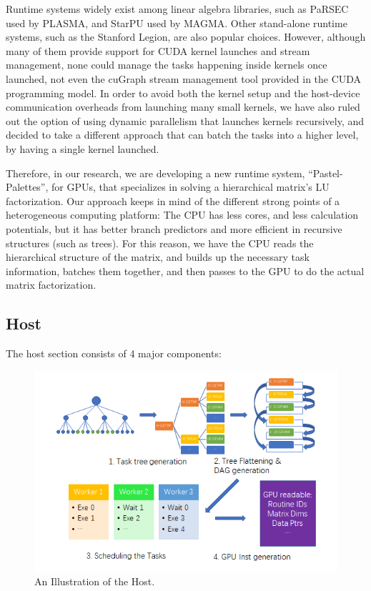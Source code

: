 \documentclass[sigconf]{acmart}
\begin{document}
Runtime systems widely exist among linear algebra libraries, such as PaRSEC\cite{Hoque:2017:DTD:3148226.3148233} used by PLASMA\cite{Dongarra:2015:PPM:3026767.3026772}, and StarPU\cite{thibault:tel-01959127} used by MAGMA\cite{dghklty14}. Other stand-alone runtime systems, such as the Stanford Legion\cite{Bauer:2012:LEL:2388996.2389086}, are also popular choices. However, although many of them provide support for CUDA kernel launches and stream management, none could manage the tasks happening inside kernels once launched, not even the cuGraph stream management tool provided in the CUDA programming model. In order to avoid both the kernel setup and the host-device communication overheads from launching many small kernels, we have also ruled out the option of using dynamic parallelism that launches kernels recursively, and decided to take a different approach that can batch the tasks into a higher level, by having a single kernel launched.

Therefore, in our research, we are developing a new runtime system, ``Pastel-Palettes'', for GPUs, that specializes in solving a hierarchical matrix's LU factorization. Our approach keeps in mind of the different strong points of a heterogeneous computing platform: The CPU has less cores, and less calculation potentials, but it has better branch predictors and more efficient in recursive structures (such as trees). For this reason, we have the CPU reads the hierarchical structure of the matrix, and builds up the necessary task information, batches them together, and then passes to the GPU to do the actual matrix factorization.

\subsection{Host}

The host section consists of 4 major components:

\begin{figure}[ht]
  \centering
  \includegraphics[width=\linewidth]{host_illust}
  \caption{An Illustration of the Host.}
\end{figure}
\end{document}

